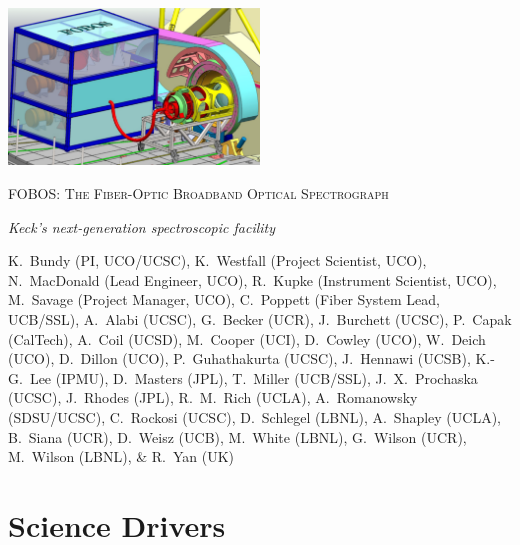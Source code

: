 \documentclass[oneside,11pt]{amsart}
\begin{document}


\vspace*{-1.5cm}

\centerline{\includegraphics[width=0.5\textwidth]{figs/FOBOS_inst_v2.pdf}}
\centerline{\textsc {\Large FOBOS: The Fiber-Optic Broadband Optical Spectrograph}}
\smallskip
\centerline{\large\it Keck's next-generation spectroscopic facility}
\smallskip
\begin{center}
{\footnotesize K.~Bundy (PI, UCO/UCSC), K.~Westfall (Project Scientist,
UCO), N.~MacDonald (Lead Engineer, UCO), R.~Kupke (Instrument
Scientist, UCO), M.~Savage (Project Manager, UCO), C.~Poppett (Fiber
System Lead, UCB/SSL), A.~Alabi (UCSC), G.~Becker (UCR), J.~Burchett
(UCSC), P.~Capak (CalTech), A.~Coil (UCSD), M.~Cooper (UCI),
D.~Cowley (UCO), W.~Deich (UCO), D.~Dillon (UCO), P.~Guhathakurta
(UCSC), J.~Hennawi (UCSB), K.-G.~Lee (IPMU), D.~Masters (JPL),
T.~Miller (UCB/SSL), J.~X.~Prochaska (UCSC), J.~Rhodes (JPL),
R.~M.~Rich (UCLA), A.~Romanowsky (SDSU/UCSC), C.~Rockosi (UCSC),
D.~Schlegel (LBNL), A.~Shapley (UCLA), B.~Siana (UCR), D.~Weisz
(UCB), M.~White (LBNL), G.~Wilson (UCR), M.~Wilson (LBNL), \& R.~Yan
(UK)}
\end{center}




\section{Science Drivers}
\label{sec:goals}
\end{document}
